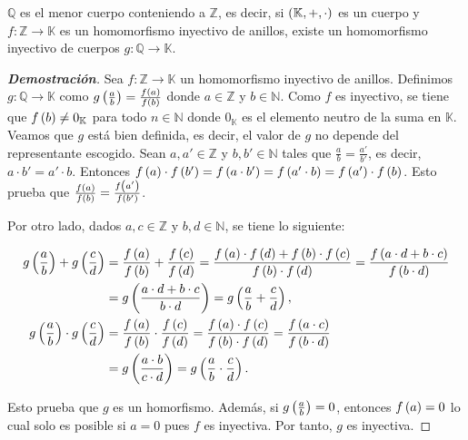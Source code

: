 \begin{proposition}
    \rm $\mathbb{Q}$ es el menor cuerpo conteniendo a $\mathbb{Z}$, es decir, si $\left(\mathbb{K},+,\cdot\right)$ es un cuerpo y $f:\mathbb{Z}\rightarrow\mathbb{K}$ es un homomorfismo inyectivo de anillos, existe un homomorfismo inyectivo de cuerpos $g:\mathbb{Q}\rightarrow\mathbb{K}$.
    \begin{proof}[\rm\textbf{Demostración}]
        Sea $f:\mathbb{Z}\rightarrow\mathbb{K}$ un homomorfismo inyectivo de anillos. Definimos $g:\mathbb{Q}\rightarrow\mathbb{K}$ como $g\left(\frac{a}{b}\right)=\frac{f\left(a\right)}{f\left(b\right)}$ donde $a\in\mathbb{Z}$ y $b\in\mathbb{N}$. Como $f$ es inyectivo, se tiene que $f\left(b\right)\neq 0_{\mathbb{K}}$ para todo $n\in\mathbb{N}$ donde $0_{\mathbb{K}}$ es el elemento neutro de la suma en $\mathbb{K}$. Veamos que $g$ está bien definida, es decir, el valor de $g$ no depende del representante escogido. Sean $a,a'\in\mathbb{Z}$ y $b,b'\in\mathbb{N}$ tales que $\frac{a}{b}=\frac{a'}{b'}$, es decir, $a\cdot b'=a'\cdot b$. Entonces $f\left(a\right)\cdot f\left(b'\right)=f\left(a\cdot b'\right)=f\left(a'\cdot b\right)=f\left(a'\right)\cdot f\left(b\right)$. Esto prueba que $\frac{f\left(a\right)}{f\left(b\right)}=\frac{f\left(a'\right)}{f\left(b'\right)}$.

        Por otro lado, dados $a,c\in\mathbb{Z}$ y $b,d\in\mathbb{N}$, se tiene lo siguiente:

        \begin{equation}
            \begin{split}
                g\left(\frac{a}{b}\right)+g\left(\frac{c}{d}\right) & =\frac{f\left(a\right)}{f\left(b\right)}+\frac{f\left(c\right)}{f\left(d\right)}=\frac{f\left(a\right)\cdot f\left(d\right)+f\left(b\right)\cdot f\left(c\right)}{f\left(b\right)\cdot f\left(d\right)}=\frac{f\left(a\cdot d+b\cdot c\right)}{f\left(b\cdot d\right)}\\
                & =g\left(\frac{a\cdot d+b\cdot c}{b\cdot d}\right)=g\left(\frac{a}{b}+\frac{c}{d}\right),\\
                g\left(\frac{a}{b}\right)\cdot g\left(\frac{c}{d}\right) & =\frac{f\left(a\right)}{f\left(b\right)}\cdot\frac{f\left(c\right)}{f\left(d\right)}=\frac{f\left(a\right)\cdot f\left(c\right)}{f\left(b\right)\cdot f\left(d\right)}=\frac{f\left(a\cdot c\right)}{f\left(b\cdot d\right)}\\
                & =g\left(\frac{a\cdot b}{c\cdot d}\right)=g\left(\frac{a}{b}\cdot\frac{c}{d}\right).
            \end{split}
        \end{equation}

        Esto prueba que $g$ es un homorfismo. Además, si $g\left(\frac{a}{b}\right)=0$, entonces $f\left(a\right)=0$ lo cual solo es posible si $a=0$ pues $f$ es inyectiva. Por tanto, $g$ es inyectiva.
    \end{proof}
\end{proposition}

